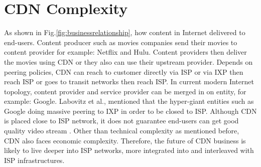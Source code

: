 \documentclass[paper]{ieice}
\begin{document}

\section{CDN Complexity}
As shown in Fig.\ref{fig:businessrelationship}, how content in Internet delivered to end-users.  
Content producer such as movies companies send their movies to content provider for example: Netflix and Hulu.
Content providers then deliver the movies using CDN or they also can use their upstream provider.
Depends on peering policies, CDN can reach to customer directly via ISP or via IXP then reach ISP or goes to transit networks then reach ISP.   
In current modern Internet topology, content provider and service provider can be merged in on entity, for example: Google.
Labovitz et al.,\cite{Labovitz:2010:IIT:2043164.1851194} mentioned that the hyper-giant entities such as Google doing massive peering to IXP in order to be closed to ISP. 
Although CDN is placed close to ISP network, it does not guarantee end-users can get good quality video stream \cite{Krishnan:2009:MBE:1644893.1644917}.
Other than technical complexity as mentioned before, CDN also faces economic complexity\cite{dispute}.
Therefore, the future of CDN business is likely to live deeper into ISP networks, more integrated into and interleaved with ISP infrastructures.
\end{document}
